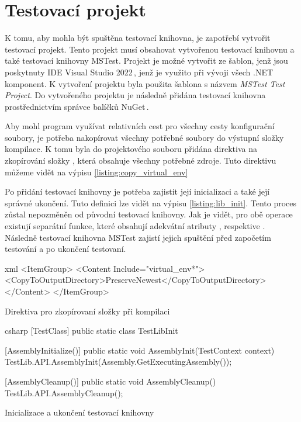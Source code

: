 \section{Testovací projekt}

K tomu, aby mohla být spuštěna testovací knihovna, je zapotřebí vytvořit testovací projekt. Tento projekt musí obsahovat vytvořenou testovací knihovnu a také testovací knihovny MSTest. Projekt je možné vytvořit ze šablon, jenž jsou poskytnuty IDE Visual Studio 2022\,\cite{vs2022}, jenž je využito při vývoji všech .NET komponent. K vytvoření projektu byla použita šablona s názvem \textit{MSTest Test Project}. Do vytvořeného projektu je následně přidána testovací knihovna prostřednictvím správce balíčků NuGet\,\cite{nuget}. 

Aby mohl program využívat relativních cest pro všechny cesty konfigurační soubory, je potřeba nakopírovat všechny potřebné soubory do výstupní složky kompilace. K tomu byla do projektového souboru přidána direktiva na zkopírování složky , která obsahuje všechny potřebné zdroje. Tuto direktivu můžeme vidět na výpisu \ref{listing:copy_virtual_env}

Po přidání testovací knihovny je potřeba zajistit její inicializaci a také její správné ukončení. Tuto definici lze vidět na výpisu \ref{listing:lib_init}. Tento proces zůstal nepozměněn od původní testovací knihovny. Jak je vidět, pro obě operace existují separátní funkce, které obsahují adekvátní atributy , respektive . Následně testovací knihovna MSTest zajistí jejich spuštění před započetím testování a po ukončení testovaní.  

\begin{listing}[htbp]
    \centering
    \begin{cminted}[breaklines,autogobble, fontsize=\footnotesize]{xml}
<ItemGroup>
    <Content Include="virtual_env\**">
        <CopyToOutputDirectory>PreserveNewest</CopyToOutputDirectory>
    </Content>
</ItemGroup>
    \end{cminted}
\caption{Direktiva pro zkopírovaní složky při kompilaci}
\label{listing:copy_virtual_env}
\end{listing}

\begin{listing}[htbp]
    \centering
    \begin{cminted}[breaklines,autogobble, fontsize=\small]{csharp}
[TestClass]
public static class TestLibInit
{
    [AssemblyInitialize()]
    public static void AssemblyInit(TestContext context)
    {
        TestLib.API.AssemblyInit(Assembly.GetExecutingAssembly());
    }

    [AssemblyCleanup()]
    public static void AssemblyCleanup()
    {
        TestLib.API.AssemblyCleanup();
    }
}
    \end{cminted}
\caption{Inicializace a ukončení testovací knihovny}
\label{listing:lib_init}
\end{listing}

